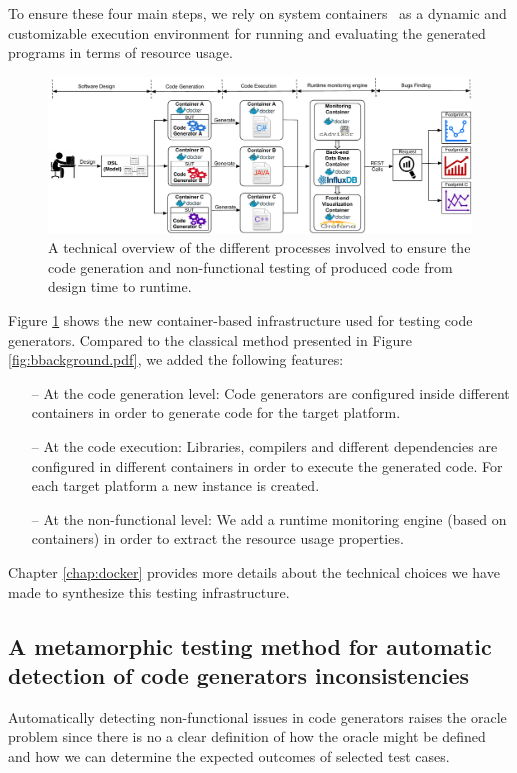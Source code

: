 To ensure these four main steps, we rely on system containers~\cite{soltesz2007container} as a dynamic and customizable execution environment for running and evaluating the generated programs in terms of resource usage.

\begin{figure}[h]
	\center
	\includegraphics[width=1.\linewidth]{chapitre5/fig/docker_background2.pdf}
	\caption{A technical overview of the different processes involved to ensure the code generation and non-functional testing of produced code from design time to runtime.}
	\label{fig:cg-infra}
\end{figure}

Figure \ref{fig:cg-infra} shows the new container-based infrastructure used for testing code generators. Compared to the classical method presented in Figure \ref{fig:bbackground.pdf}, we added the following features: 
\begin{itemize}
	\item[--] At the code generation level: Code generators are configured inside different containers in order to generate code for the target platform.
	\item[--] At the code execution: Libraries, compilers and different dependencies are configured in different containers in order to execute the generated code. For each target platform a new instance is created.
	\item[--] At the non-functional level: We add a runtime monitoring engine (based on containers) in order to extract the resource usage properties.
\end{itemize}

Chapter \ref{chap:docker} provides more details about the technical choices we have made to synthesize this testing infrastructure.




\subsection{A metamorphic testing method for automatic detection of code generators inconsistencies}
Automatically detecting non-functional issues in code generators raises the oracle problem since there is no a clear definition of how the oracle might be defined and how we can determine the expected outcomes of selected test cases.

